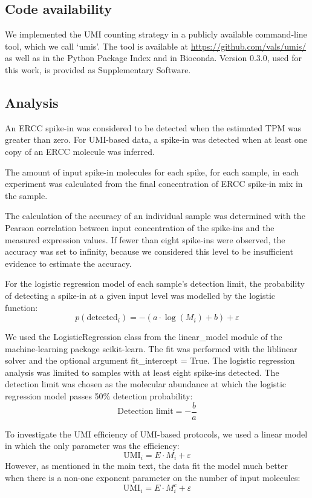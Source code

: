 \subsection{Code availability}

We implemented the UMI counting strategy in a publicly available command-line tool, which we call ‘umis’. The tool is available at \url{https://github.com/vals/umis/} as well as in the Python Package Index and in Bioconda. Version 0.3.0, used for this work, is provided as Supplementary Software.

\subsection{Analysis}

An ERCC spike-in was considered to be detected when the estimated TPM was greater than zero. For UMI-based data, a spike-in was detected when at least one copy of an ERCC molecule was inferred.

The amount of input spike-in molecules for each spike, for each sample, in each experiment was calculated from the final concentration of ERCC spike-in mix in the sample.

The calculation of the accuracy of an individual sample was determined with the Pearson correlation between input concentration of the spike-ins and the measured expression values. If fewer than eight spike-ins were observed, the accuracy was set to infinity, because we considered this level to be insufficient evidence to estimate the accuracy.

For the logistic regression model of each sample’s detection limit, the probability of detecting a spike-in at a given input level was modelled by the logistic function:
\[
    p(\text{detected}_i)= -(a \cdot \log(M_i) + b) + \varepsilon
\]

We used the LogisticRegression class from the linear\_model module of the machine-learning package scikit-learn. The fit was performed with the liblinear solver and the optional argument fit\_intercept = True. The logistic regression analysis was limited to samples with at least eight spike-ins detected. The detection limit was chosen as the molecular abundance at which the logistic regression model passes 50\% detection probability:
\[
    \text{Detection limit} = -\frac{b}{a}
\]

To investigate the UMI efficiency of UMI-based protocols, we used a linear model in which the only parameter was the efficiency:
\[
    \text{UMI}_i = E \cdot M_i + \varepsilon
\]
However, as mentioned in the main text, the data fit the model much better when there is a non-one exponent parameter on the number of input molecules:
\[
    \text{UMI}_i = E \cdot M_i^c + \varepsilon
\]

